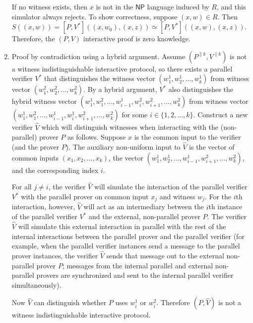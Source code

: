 \documentclass[draft]{article}
\begin{document}
\begin{enumerate}
  If no witness exists, then $x$ is not in the $\mathsf{NP}$ language induced by $R$, and this simulator always rejects.
  To show correctness, suppose $(x, w)\in R$.
  Then $S\left((x, w)\right)=[P, V^*]\left((x, w_0), (x, z)\right)\simeq[P, V^*]\left((x, w), (x, z)\right)$.
  Therefore, the $(P, V)$ interactive proof is zero knowledge.

\item
  Proof by contradiction using a hybrid argument.
  Assume $(P^{\|k}, V^{\|k})$ is not a witness indistinguishable interactive protocol, so there exists a parallel verifier $V^*$ that distinguishes the witness vector $(w^1_1, w^1_2, \ldots, w^1_k)$ from witness vector $(w^2_1, w^2_2, \ldots, w^2_k)$.
  By a hybrid argument, $V^*$ also distinguishes the hybrid witness vector $(w^1_1, w^2_1, \ldots, w^1_{i-1}, w^2_i, w^2_{i+1}, \ldots, w^2_k)$ from witness vector $(w^1_1, w^2_1, \ldots, w^1_{i-1}, w^1_i, w^2_{i+1}, \ldots, w^2_k)$ for some $i\in\{1, 2, \ldots, k\}$.
  Construct a new verifier $\hat{V}$ which will distinguish witnesses when interacting with the (non-parallel) prover $P$ as follows.
  Suppose $x$ is the common input to the verifier (and the prover $P$).
  The auxiliary non-uniform input to $\hat{V}$ is the vector of common inputs $(x_1, x_2, \ldots, x_k)$, the vector $(w^1_1, w^1_2, \ldots, w^1_{i-1}, w^2_{i+1}, \ldots, w^2_k)$, and the corresponding index $i$.

  For all $j\neq i$, the verifier $\hat{V}$ will simulate the interaction of the parallel verifier $V^*$ with the parallel prover on common input $x_j$ and witness $w_j$.
  For the $i$th interaction, however, $\hat{V}$ will act as an intermediary between the $i$th instance of the parallel verifier $V^*$ and the external, non-parallel prover $P$.
  The verifier $\hat{V}$ will simulate this external interaction in parallel with the rest of the internal interactions between the parallel prover and the parallel verifier (for example, when the parallel verifier instances send a message to the parallel prover instances, the verifier $\hat{V}$ sends that message out to the external non-parallel prover $P$; messages from the internal parallel and external non-parallel provers are synchronized and sent to the internal parallel verifier simultaneously).

  Now $\hat{V}$ can distinguish whether $P$ uses $w^1_i$ or $w^2_i$.
  Therefore $(P, \hat{V})$ is not a witness indistinguishable interactive protocol.
\end{enumerate}
\end{document}
